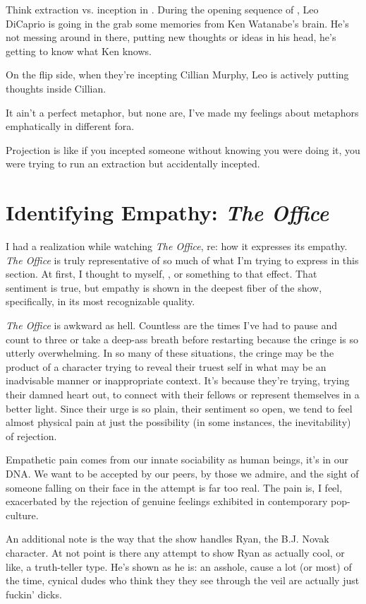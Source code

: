 \documentclass[../butidigress.tex]{subfiles}
\begin{document}
Think extraction vs. inception in .
During the opening sequence of , Leo DiCaprio is going in the grab some memories from Ken Watanabe's brain.
He's not messing around in there, putting new thoughts or ideas in his head, he's getting to know what Ken knows.

On the flip side, when they're incepting Cillian Murphy, Leo is actively putting thoughts inside Cillian.

It ain't a perfect metaphor, but none are, I've made my feelings about metaphors emphatically in different fora.

Projection is like if you incepted someone without knowing you were doing it, you were trying to run an extraction but accidentally incepted.

\section{Identifying Empathy: \textit{The Office}}\label{sec:theoffice}
I had a realization while watching \textit{The Office}, re: how it expresses its empathy.
\textit{The Office} is truly representative of so much of what I'm trying to express in this section.
At first, I thought to myself, , or something to that effect.
That sentiment is true, but empathy is shown in the deepest fiber of the show, specifically, in its most recognizable quality.

\textit{The Office} is awkward as hell.
Countless are the times I've had to pause and count to three or take a deep-ass breath before restarting because the cringe is so utterly overwhelming.
In so many of these situations, the cringe may be the product of a character trying to reveal their truest self in what may be an inadvisable manner or inappropriate context.
It's because they're trying, trying their damned heart out, to connect with their fellows or represent themselves in a better light.
Since their urge is so plain, their sentiment so open, we tend to feel almost physical pain at just the possibility (in some instances, the inevitability) of rejection.

Empathetic pain comes from our innate sociability as human beings, it's in our DNA.
We want to be accepted by our peers, by those we admire, and the sight of someone falling on their face in the attempt is far too real.
The pain is, I feel, exacerbated by the rejection of genuine feelings exhibited in contemporary pop-culture.

An additional note is the way that the show handles Ryan, the B.J. Novak character.
At not point is there any attempt to show Ryan as actually cool, or like, a truth-teller type.
He's shown as he is: an asshole, cause a lot (or most) of the time, cynical dudes who think they they see through the veil are actually just fuckin' dicks.
\end{document}
